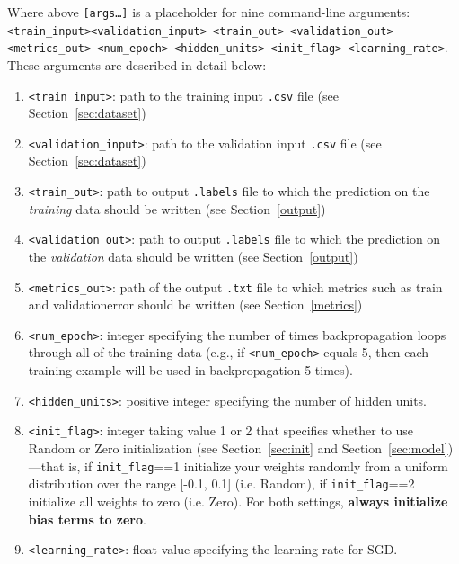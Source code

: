 \documentclass[11pt,addpoints,answers]{exam}
\begin{document}
Where above \texttt{[args\dots]} is a placeholder for nine command-line arguments: \texttt{<train\_input>}\newline \texttt{<validation\_input> <train\_out> <validation\_out> <metrics\_out> <num\_epoch> \newline <hidden\_units>  <init\_flag> <learning\_rate>}. These arguments are described in detail below:
\begin{enumerate}
    \item \texttt{<train\_input>}: path to the training input \texttt{.csv} file (see Section~\ref{sec:dataset})
    \item \texttt{<validation\_input>}: path to the validation input \texttt{.csv} file (see Section~\ref{sec:dataset})
    \item \texttt{<train\_out>}: path to output \texttt{.labels} file to which the prediction on the \emph{training} data should be written (see Section~\ref{output})
    \item \texttt{<validation\_out>}: path to output \texttt{.labels} file to which the prediction on the \emph{validation} data should be written (see Section~\ref{output})
    \item \texttt{<metrics\_out>}: path of the output \texttt{.txt} file to which metrics such as train and validation\thinspace error should be written (see Section~\ref{metrics})
    \item \texttt{<num\_epoch>}: integer specifying the number of times backpropagation loops through all of the training data (e.g., if \texttt{<num\_epoch>} equals 5, then each training example will be used in backpropagation 5 times).
    \item \texttt{<hidden\_units>}: positive integer specifying the number of hidden units. 
    \item \texttt{<init\_flag>}: integer taking value 1 or 2 that specifies whether to use {\sc Random} or {\sc Zero} initialization (see Section~\ref{sec:init} and Section~\ref{sec:model})---that is, if \lstinline{init_flag}==1 initialize your weights randomly from a uniform distribution over the range [-0.1, 0.1] (i.e. {\sc Random}), if \lstinline{init_flag}==2 initialize all weights to zero (i.e. {\sc Zero}). For both settings, {\bf always initialize bias terms to zero}.
    \item \texttt{<learning\_rate>}: float value specifying the learning rate for SGD.
    
\end{enumerate}
\end{document}
